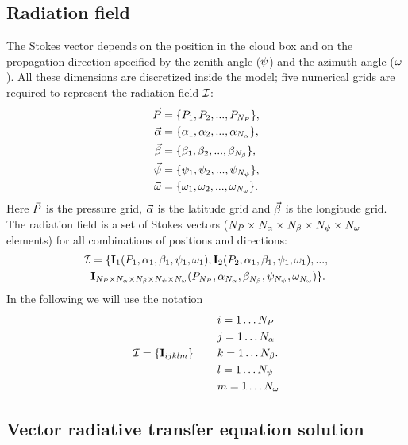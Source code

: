 \subsection{Radiation field}
\label{sec:scattering:rad_field}
The Stokes vector depends on the
position in the cloud box and on the propagation direction specified
by the zenith angle ($\psi$) and the azimuth angle ($\omega$). All
these dimensions are discretized inside the model; five
numerical grids are required to represent the radiation field
${\mathcal I}$:
\begin{eqnarray}
  \vec{P} &= \{ P_1, P_2, ... , P_{N_{P}}\}, \nonumber \\
  \vec{\alpha} &= \{ \alpha_1, \alpha_2, ... , \alpha_{N_{\alpha}}\}, \nonumber \\
  \vec{\beta} &= \{\beta_1, \beta_2, ... , \beta_{N_{\beta}}\}, \\
  \vec{\psi} &= \{\psi_1, \psi_2, ... , \psi_{N_{\psi}}\}, \nonumber \\
  \vec{\omega} &= \{\omega_1, \omega_2, ... , \omega_{N_{\omega}}\}. \nonumber 
\end{eqnarray}
Here $\vec{P}$ is the pressure grid, $\vec{\alpha}$ is the latitude
grid and $\vec{\beta}$ is the longitude grid.
The radiation field is a set of Stokes vectors ($N_{P}\times N_{\alpha}
\times N_{\beta} \times N_{\psi} \times N_{\omega}$ elements) for all
combinations of positions and directions:
\begin{eqnarray}
  {\mathcal I} &= \{ {\bf I}_1(P_1,\alpha_1, \beta_1, \psi_1, \omega_1),
  {\bf I}_2(P_2,\alpha_1, \beta_1, \psi_1, \omega_1), ... , \nonumber \\ 
  &{\bf I}_{N_{P}\times N_{\alpha} \times N_{\beta} \times N_{\psi} \times N_{\omega}}
  (P_{N_{P}},\alpha_{N_{\alpha}}, \beta_{N_{\beta}}, \psi_{N_{\psi}}, 
  \omega_{N_{\omega}}) \}. 
\end{eqnarray}
In the following we will use the notation
\begin{eqnarray}
  & i = 1 \ldots N_{P}  \nonumber \\
  & j = 1 \ldots N_{\alpha}  \nonumber \\
  {\mathcal I} = \left\{{\bf I}_{ijklm}\right\}  \hspace{5ex}&
  k = 1 \ldots N_{\beta}. \\
  &  l = 1 \ldots N_{\psi}  \nonumber \\
  &  m = 1 \ldots N_{\omega}  \nonumber
\end{eqnarray}

\subsection{Vector radiative transfer equation solution} 
\label{sec:scattering:VRTE_sol}

